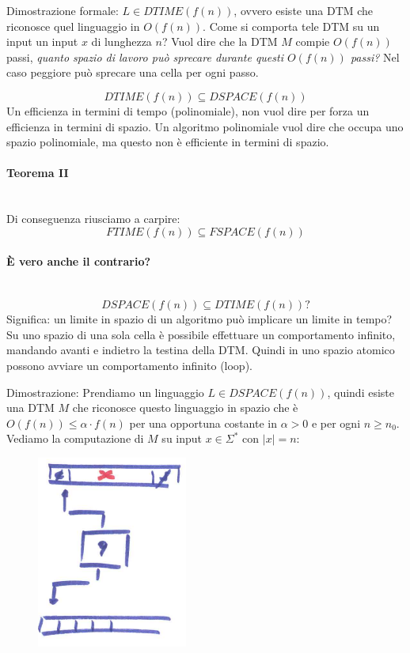\documentclass{article}
\begin{document}
Dimostrazione formale: $L\in DTIME(f(n))$, ovvero esiste una DTM che riconosce quel linguaggio in
$O(f(n))$. Come si comporta tele DTM su un input un input $x$ di lunghezza $n$?
Vuol dire che la DTM $M$ compie $O(f(n))$ passi,
\textit{quanto spazio di lavoro può sprecare durante questi $O(f(n))$ passi?} Nel caso peggiore
può sprecare una cella per ogni passo.

$$DTIME(f(n))\subseteq DSPACE(f(n))$$
Un efficienza in termini di tempo (polinomiale), non vuol dire per forza un efficienza in termini
di spazio. Un algoritmo polinomiale vuol dire che occupa uno spazio polinomiale, ma questo
non è efficiente in termini di spazio.

\paragraph{Teorema II}\mbox{}\\
Di conseguenza riusciamo a carpire:
$$FTIME(f(n))\subseteq FSPACE(f(n))$$

\paragraph{È vero anche il contrario?}\mbox{}\\
$$DSPACE(f(n))\subseteq DTIME(f(n))?$$
Significa: un limite in spazio di un algoritmo può implicare un limite in tempo? Su uno spazio
di una sola cella è possibile effettuare un comportamento infinito, mandando avanti e indietro
la testina della DTM. Quindi in uno spazio atomico possono avviare un comportamento infinito (loop).

Dimostrazione: Prendiamo un linguaggio $L\in DSPACE(f(n))$, quindi esiste una DTM $M$ che riconosce
questo linguaggio in spazio che è $O(f(n))\leq\alpha\cdot f(n)$ per una opportuna costante in
$\alpha >0$ e per ogni $n\geq n_0$. Vediamo la computazione di $M$ su input $x\in\Sigma^*$ con $|x|=n$:

\begin{figure}[H]
    \centering
    \includegraphics[scale=0.6]{images/comput_DTM_c.png}
\end{figure}
\end{document}
